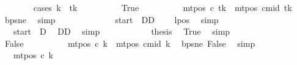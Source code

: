 \begin{isabellebody}
\ \ \ \ \ \ \isamarkupfalse%
\ {\isacharparenleft}{\kern0pt}cases\ {\isachardoublequoteopen}k{\isacharprime}{\kern0pt}\ {\isacharequal}{\kern0pt}\ tk{\isachardoublequoteclose}{\isacharparenright}{\kern0pt}\isanewline
\ \ \ \ \ \ \ \ \isamarkupfalse%
\ True\isanewline
\ \ \ \ \ \ \ \ \isamarkupfalse%
\ {\isachardoublequoteopen}mt{\isacharunderscore}{\kern0pt}pos\ c{\isacharprime}{\kern0pt}\ tk\ {\isacharequal}{\kern0pt}\ mt{\isacharunderscore}{\kern0pt}pos\ cmid\ tk\ {\isacharminus}{\kern0pt}\ {}{\isachardoublequoteclose}\ \isamarkupfalse%
\ bps{\isacharunderscore}{\kern0pt}ne\ \isamarkupfalse%
\ simp\isanewline
\ \ \ \ \ \ \ \ \isamarkupfalse%
\ \isamarkupfalse%
\ {\isachardoublequoteopen}{\isasymdots}\ {\isacharequal}{\kern0pt}\ {\isacharparenleft}{\kern0pt}{\isacharquery}{\kern0pt}start\ {\isacharminus}{\kern0pt}\ DD{\isacharparenright}{\kern0pt}\ {\isacharminus}{\kern0pt}\ {}{\isachardoublequoteclose}\ \isamarkupfalse%
\ lpos\ \isamarkupfalse%
\ simp\isanewline
\ \ \ \ \ \ \ \ \isamarkupfalse%
\ \isamarkupfalse%
\ {\isachardoublequoteopen}{\isasymdots}\ {\isacharequal}{\kern0pt}\ {\isacharquery}{\kern0pt}start\ {\isacharminus}{\kern0pt}\ {\isacharquery}{\kern0pt}D{\isachardoublequoteclose}\ \isamarkupfalse%
\ DD\ \isamarkupfalse%
\ simp\isanewline
\ \ \ \ \ \ \ \ \isamarkupfalse%
\ \isamarkupfalse%
\ {\isacharquery}{\kern0pt}thesis\ \isamarkupfalse%
\ True\ \isamarkupfalse%
\ simp\isanewline
\ \ \ \ \ \ \isamarkupfalse%
\isanewline
\ \ \ \ \ \ \ \ \isamarkupfalse%
\ False\isanewline
\ \ \ \ \ \ \ \ \isamarkupfalse%
\ {\isachardoublequoteopen}mt{\isacharunderscore}{\kern0pt}pos\ c{\isacharprime}{\kern0pt}\ k{\isacharprime}{\kern0pt}\ {\isacharequal}{\kern0pt}\ mt{\isacharunderscore}{\kern0pt}pos\ cmid\ k{\isacharprime}{\kern0pt}{\isachardoublequoteclose}\ \isamarkupfalse%
\ bps{\isacharunderscore}{\kern0pt}ne\ False\ \isamarkupfalse%
\ simp\isanewline
\ \ \ \ \ \ \ \ \isamarkupfalse%
\ \isamarkupfalse%
\ {\isachardoublequoteopen}{\isasymdots}\ {\isacharequal}{\kern0pt}\ mt{\isacharunderscore}{\kern0pt}pos\ c{}\ k{\isacharprime}{\kern0pt}{\isachardoublequoteclose}\ \isamarkupfalse%

\end{isabellebody}
